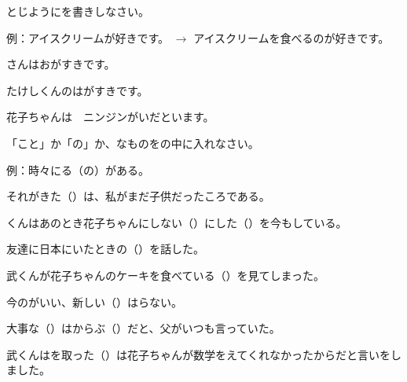 
\author{Tomislav Mamić}

	
	\ten\begin{mondai}{とじようにを書きしなさい。}
		\itemsep0pt
		\item 例：アイスクリームが好きです。 $\rightarrow$ アイスクリームを食べるのが好きです。
		\item {}さんはおがすきです。
		\item たけしくんのは\hspace{10pt}がすきです。
		\item 花子ちゃんは　ニンジンがいだといます。
	\end{mondai}

	\vspace{20pt}
	\ten\begin{mondai}{「こと」か「の」か、なものをの中に入れなさい。}
		\itemsep0pt
		\item 例：時々にる（の）がある。
		\item それがきた（\hspace{20pt}）は、私がまだ子供だったころである。
		\item{}くんはあのとき花子ちゃんにしない（\hspace{20pt}）にした（\hspace{20pt}）を今もしている。
		\item 友達に日本にいたときの（\hspace{20pt}）を話した。
		\item 武くんが花子ちゃんのケーキを食べている（\hspace{20pt}）を見てしまった。
		\item 今のがいい、新しい（\hspace{20pt}）はらない。
		\item 大事な（\hspace{20pt}）はからぶ（\hspace{20pt}）だと、父がいつも言っていた。
		\item 武くんはを取った（\hspace{20pt}）は花子ちゃんが数学をえてくれなかったからだと言いをしました。
	\end{mondai}
